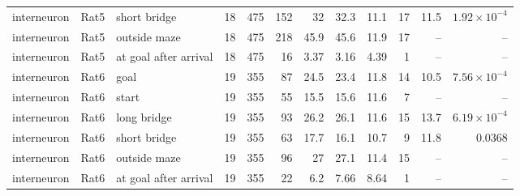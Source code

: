 \begin{table}[htbp]
\begin{tabular}{lllrrrrrrrrr}
interneuron & Rat5 & short bridge & 18 & 475 & 152 & 32 & 32.3 & 11.1 & 17 & 11.5 & $1.92\times10^{-4}$ \\
interneuron & Rat5 & outside maze & 18 & 475 & 218 & 45.9 & 45.6 & 11.9 & 17 & -- & -- \\
interneuron & Rat5 & at goal after arrival & 18 & 475 & 16 & 3.37 & 3.16 & 4.39 & 1 & -- & -- \\
interneuron & Rat6 & goal & 19 & 355 & 87 & 24.5 & 23.4 & 11.8 & 14 & 10.5 & $7.56\times10^{-4}$ \\
interneuron & Rat6 & start & 19 & 355 & 55 & 15.5 & 15.6 & 11.6 & 7 & -- & -- \\
interneuron & Rat6 & long bridge & 19 & 355 & 93 & 26.2 & 26.1 & 11.6 & 15 & 13.7 & $6.19\times10^{-4}$ \\
interneuron & Rat6 & short bridge & 19 & 355 & 63 & 17.7 & 16.1 & 10.7 & 9 & 11.8 & 0.0368 \\
interneuron & Rat6 & outside maze & 19 & 355 & 96 & 27 & 27.1 & 11.4 & 15 & -- & -- \\
interneuron & Rat6 & at goal after arrival & 19 & 355 & 22 & 6.2 & 7.66 & 8.64 & 1 & -- & -- \\
\bottomrule
\end{tabular}
\end{table}
